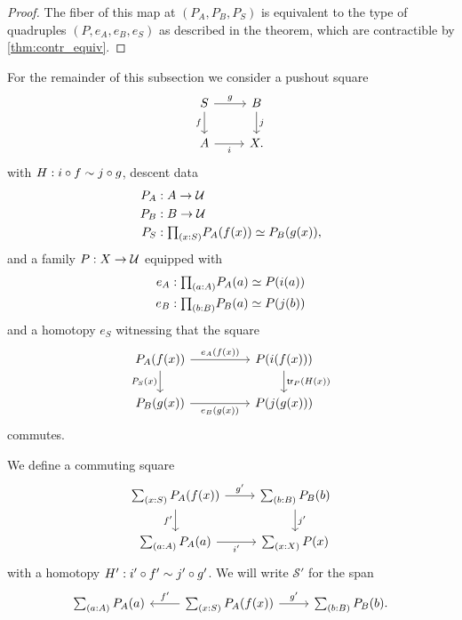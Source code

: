 \begin{proof}
The fiber of this map at $(P_A,P_B,P_S)$ is equivalent to the type of quadruples $(P,e_A,e_B,e_S)$ as described in the theorem, which are contractible by \cref{thm:contr_equiv}.
\end{proof}

For the remainder of this subsection we consider a pushout square
\begin{equation*}
\begin{tikzcd}
S \arrow[r,"g"] \arrow[d,swap,"f"] & B \arrow[d,"j"] \\
A \arrow[r,swap,"i"] & X.
\end{tikzcd}
\end{equation*}
with $H:i\circ f\sim j\circ g$, descent data
\begin{align*}
P_A & : A \to \UU \\
P_B & : B \to \UU \\
P_S & : \prd{x:S} \eqv{P_A(f(x))}{P_B(g(x))},
\end{align*}
and a family $P:X\to\mathcal{U}$ equipped with 
\begin{align*}
e_A & : \prd{a:A}\eqv{P_A(a)}{P(i(a))} \\
e_B & : \prd{b:B}\eqv{P_B(a)}{P(j(b))}
\end{align*}
and a homotopy $e_S$ witnessing that the square
\begin{equation*}
\begin{tikzcd}[column sep=huge]
P_A(f(x)) \arrow[r,"e_A(f(x))"] \arrow[d,swap,"P_S(x)"] & P(i(f(x))) \arrow[d,"\mathsf{tr}_P(H(x))"] \\
P_B(g(x)) \arrow[r,swap,"e_B(g(x))"] & P(j(g(x)))
\end{tikzcd}
\end{equation*}
commutes.

\begin{defn}
We define a commuting square
\begin{equation*}
\begin{tikzcd}
\sm{x:S}P_A(f(x)) \arrow[d,swap,"{f'}"] \arrow[r,"{g'}"] & \sm{b:B}P_B(b) \arrow[d,"{j'}"] \\
\sm{a:A}P_A(a) \arrow[r,swap,"{i'}"] & \sm{x:X}P(x)
\end{tikzcd}
\end{equation*}
with a homotopy $H':i'\circ f'\sim j'\circ g'$. We will write $\mathcal{S'}$ for the span
\begin{equation*}
\begin{tikzcd}
\sm{a:A}P_A(a) & \sm{x:S}P_A(f(x)) \arrow[l,swap,"{f'}"] \arrow[r,"{g'}"] & \sm{b:B}P_B(b).
\end{tikzcd}
\end{equation*}
\end{defn}

